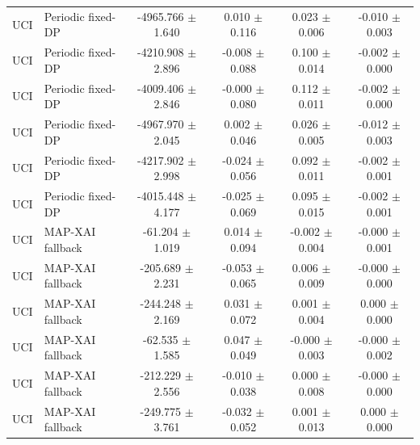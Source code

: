 \begin{table}[t]
\begin{tabular}{llcccc}
UCI & Periodic fixed-DP & -4965.766 $\pm$ 1.640 & 0.010 $\pm$ 0.116 & 0.023 $\pm$ 0.006 & -0.010 $\pm$ 0.003 \\
UCI & Periodic fixed-DP & -4210.908 $\pm$ 2.896 & -0.008 $\pm$ 0.088 & 0.100 $\pm$ 0.014 & -0.002 $\pm$ 0.000 \\
UCI & Periodic fixed-DP & -4009.406 $\pm$ 2.846 & -0.000 $\pm$ 0.080 & 0.112 $\pm$ 0.011 & -0.002 $\pm$ 0.000 \\
UCI & Periodic fixed-DP & -4967.970 $\pm$ 2.045 & 0.002 $\pm$ 0.046 & 0.026 $\pm$ 0.005 & -0.012 $\pm$ 0.003 \\
UCI & Periodic fixed-DP & -4217.902 $\pm$ 2.998 & -0.024 $\pm$ 0.056 & 0.092 $\pm$ 0.011 & -0.002 $\pm$ 0.001 \\
UCI & Periodic fixed-DP & -4015.448 $\pm$ 4.177 & -0.025 $\pm$ 0.069 & 0.095 $\pm$ 0.015 & -0.002 $\pm$ 0.001 \\
UCI & MAP-XAI fallback & -61.204 $\pm$ 1.019 & 0.014 $\pm$ 0.094 & -0.002 $\pm$ 0.004 & -0.000 $\pm$ 0.001 \\
UCI & MAP-XAI fallback & -205.689 $\pm$ 2.231 & -0.053 $\pm$ 0.065 & 0.006 $\pm$ 0.009 & -0.000 $\pm$ 0.000 \\
UCI & MAP-XAI fallback & -244.248 $\pm$ 2.169 & 0.031 $\pm$ 0.072 & 0.001 $\pm$ 0.004 & 0.000 $\pm$ 0.000 \\
UCI & MAP-XAI fallback & -62.535 $\pm$ 1.585 & 0.047 $\pm$ 0.049 & -0.000 $\pm$ 0.003 & -0.000 $\pm$ 0.002 \\
UCI & MAP-XAI fallback & -212.229 $\pm$ 2.556 & -0.010 $\pm$ 0.038 & 0.000 $\pm$ 0.008 & -0.000 $\pm$ 0.000 \\
UCI & MAP-XAI fallback & -249.775 $\pm$ 3.761 & -0.032 $\pm$ 0.052 & 0.001 $\pm$ 0.013 & 0.000 $\pm$ 0.000 \\
\bottomrule
\end{tabular}
\end{table}
